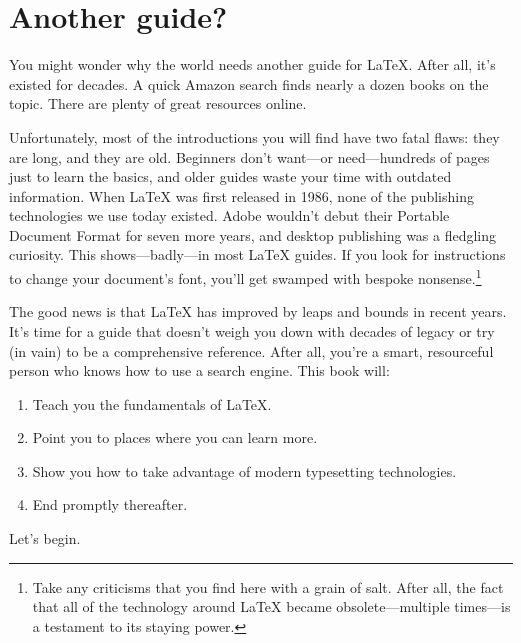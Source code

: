 \section{Another guide?}

You might wonder why the world needs another guide for \LaTeX{}.
After all, it's existed for decades.
A quick Amazon search finds nearly a dozen books on the topic.
There are plenty of great resources online.

Unfortunately, most of the introductions you will find have two fatal flaws:
they are long, and they are old.
Beginners don't want---or need---hundreds of pages just to learn the basics,
and older guides waste your time with outdated information.
When \LaTeX{} was first released in 1986, none of the publishing technologies
we use today existed.
Adobe wouldn't debut their Portable Document Format for seven more years,
and desktop publishing was a fledgling curiosity.
This shows---badly---in most \LaTeX{} guides.
If you look for instructions to change your document's font,
you'll get swamped with bespoke nonsense.\punckern\footnote{%
Take any criticisms that you find here with a grain of
salt. After all, the fact that all of the technology around \LaTeX{} became
obsolete---multiple times---is a testament to its staying power.}

The good news is that  \LaTeX{} has improved by leaps and bounds in recent years.
It's time for a guide that doesn't weigh you down with decades of legacy
or try (in vain) to be a comprehensive reference.
After all, you're a smart, resourceful person who knows how to use a
search engine.
This book will:

\begin{enumerate}
\item Teach you the fundamentals of \LaTeX.
\item Point you to places where you can learn more.
\item Show you how to take advantage of modern typesetting technologies.
\item End promptly thereafter.
\end{enumerate}
\vspace{\baselineskip}

\noindent Let's begin.
